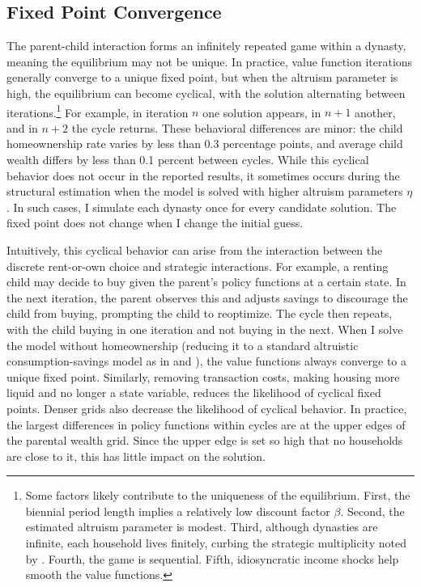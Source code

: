 \documentclass[12pt]{article}
\begin{document}
\subsection{Fixed Point Convergence}
The parent-child interaction forms an infinitely repeated game within a dynasty, meaning the equilibrium may not be unique. In practice, value function iterations generally converge to a unique fixed point, but when the altruism parameter is high, the equilibrium can become cyclical, with the solution alternating between iterations.\footnote{Some factors likely contribute to the uniqueness of the equilibrium. First,  the biennial period length implies a relatively low discount factor $\beta$. Second, the estimated altruism parameter is modest. Third, although dynasties are infinite, each household lives finitely, curbing the strategic multiplicity noted by \citet[Footnote 9]{Barczyk2020a}. Fourth, the game is sequential. Fifth, idiosyncratic income shocks help smooth the value functions.} For example, in iteration $n$ one solution appears, in $n+1$ another, and in $n+2$ the cycle returns. These behavioral differences are minor: the child homeownership rate varies by less than 0.3 percentage points, and average child wealth differs by less than 0.1 percent between cycles. While this cyclical behavior does not occur in the reported results, it sometimes occurs during the structural estimation when the model is solved with higher altruism parameters $\eta$. In such cases, I simulate each dynasty once for every candidate solution. The fixed point does not change when I change the initial guess. 

Intuitively, this cyclical behavior can arise from the interaction between the discrete rent-or-own choice and strategic interactions. For example, a renting child may decide to buy given the parent's policy functions at a certain state. In the next iteration, the parent observes this and adjusts savings to discourage the child from buying, prompting the child to reoptimize. The cycle then repeats, with the child buying in one iteration and not buying in the next. When I solve the model without homeownership (reducing it to a standard altruistic consumption-savings model as in \cite{Barczyk2020a} and \cite{Chu2020}), the value functions always converge to a unique fixed point. Similarly, removing transaction costs, making housing more liquid and no longer a state variable, reduces the likelihood of cyclical fixed points. Denser grids also decrease the likelihood of cyclical behavior. In practice, the largest differences in policy functions within cycles are at the upper edges of the parental wealth grid. Since the upper edge is set so high that no households are close to it, this has little impact on the solution.
\end{document}
